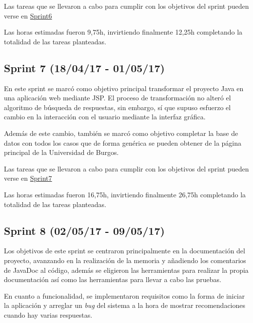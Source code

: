Las tareas que se llevaron a cabo para cumplir con los objetivos del sprint pueden verse en \href{https://github.com/DanielSantidrian/UBUassistant/milestone/9?closed=1}{Sprint6}

Las horas estimadas fueron 9,75h, invirtiendo finalmente 12,25h completando la totalidad de las tareas planteadas.


\subsection{Sprint 7 (18/04/17 - 01/05/17)}

En este sprint se marcó como objetivo principal transformar el proyecto Java en una aplicación web mediante JSP. El proceso de transformación no alteró el algoritmo de búsqueda de respuestas, sin embargo, sí que supuso esfuerzo el cambio en la interacción con el usuario mediante la interfaz gráfica.

Además de este cambio, también se marcó como objetivo completar la base de datos con todos los casos que de forma genérica se pueden obtener de la página principal de la Universidad de Burgos.

Las tareas que se llevaron a cabo para cumplir con los objetivos del sprint pueden verse en \href{https://github.com/DanielSantidrian/UBUassistant/milestone/10?closed=1}{Sprint7}

Las horas estimadas fueron 16,75h, invirtiendo finalmente 26,75h completando la totalidad de las tareas planteadas.


\subsection{Sprint 8 (02/05/17 - 09/05/17)}

Los objetivos de este sprint se centraron principalmente en la documentación del proyecto, avanzando en la realización de la memoria y añadiendo los comentarios de JavaDoc al código, además se eligieron las herramientas para realizar la propia documentación así como las herramientas para llevar a cabo las pruebas.

En cuanto a funcionalidad, se implementaron requisitos como la forma de iniciar la aplicación y arreglar un \emph{bug} del sistema a la hora de mostrar recomendaciones cuando hay varias respuestas.

